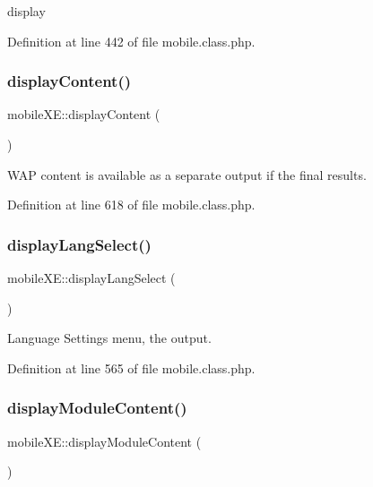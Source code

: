 display 



Definition at line 442 of file mobile.\+class.\+php.

\mbox{\label{classmobileXE_a755b22d15673cc9c172e1506b4e73418}} 
\subsubsection{\texorpdfstring{display\+Content()}{displayContent()}}
{\footnotesize\ttfamily mobile\+X\+E\+::display\+Content (\begin{DoxyParamCaption}{ }\end{DoxyParamCaption})}



W\+AP content is available as a separate output if the final results. 



Definition at line 618 of file mobile.\+class.\+php.

\mbox{\label{classmobileXE_aaed5eaefceeffc2a3509ae5d297bc379}} 
\subsubsection{\texorpdfstring{display\+Lang\+Select()}{displayLangSelect()}}
{\footnotesize\ttfamily mobile\+X\+E\+::display\+Lang\+Select (\begin{DoxyParamCaption}{ }\end{DoxyParamCaption})}



Language Settings menu, the output. 



Definition at line 565 of file mobile.\+class.\+php.

\mbox{\label{classmobileXE_a37f91cc176cd83a7816680a8be49f2ba}} 
\subsubsection{\texorpdfstring{display\+Module\+Content()}{displayModuleContent()}}
{\footnotesize\ttfamily mobile\+X\+E\+::display\+Module\+Content (\begin{DoxyParamCaption}{ }\end{DoxyParamCaption})}



